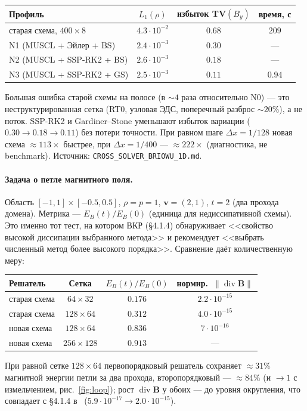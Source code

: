 \documentclass[12pt,a4paper]{article}
\newcommand{\divg}{\operatorname{div}}
\newcommand{\B}{\mathbf{B}}
\newcommand{\vv}{\mathbf{v}}
\newcommand{\code}[1]{\texttt{#1}}
\begin{document}
\begin{center}\footnotesize\setlength{\tabcolsep}{5pt}
\begin{tabular}{lccc}
\toprule
Профиль & $L_1(\rho)$ & избыток TV$(B_y)$ & время, с \\
\midrule
старая схема, $400\times8$ & $4.3\!\cdot\!10^{-2}$ & $0.68$ & $209$ \\
N1 (MUSCL + Эйлер + BS)  & $2.4\!\cdot\!10^{-3}$ & $0.30$ & --- \\
N2 (MUSCL + SSP-RK2 + BS)& $2.6\!\cdot\!10^{-3}$ & $0.18$ & --- \\
N3 (MUSCL + SSP-RK2 + GS)& $2.5\!\cdot\!10^{-3}$ & $0.11$ & $0.94$ \\
\bottomrule
\end{tabular}
\end{center}
\noindent\footnotesize Большая ошибка старой схемы на полосе (в
$\sim4$ раза относительно N0) --- это неструктурированная сетка (RT0, узловая
ЭДС, поперечный разброс $\sim20\%$), а не поток. SSP-RK2 и Gardiner--Stone
уменьшают избыток вариации ($0.30\to0.18\to0.11$) без потери точности. При
равном шаге $\Delta x=1/128$ новая схема $\approx113\times$ быстрее, при
$\Delta x=1/400$ --- $\approx222\times$ (диагностика, не benchmark). Источник:
\code{CROSS\_SOLVER\_BRIOWU\_1D.md}.\normalsize

\paragraph{Задача о петле магнитного поля.}
Область $[-1,1]\times[-0.5,0.5]$, $\rho=p=1$, $\vv=(2,1)$, $t=2$ (два прохода
домена). Метрика --- $E_B(t)/E_B(0)$ (единица для недиссипативной схемы). Это
именно тот тест, на котором ВКР \cite{shamanov2025} (\S4.1.4) обнаруживает
<<свойство высокой диссипации выбранного метода>> и рекомендует <<выбрать
численный метод более высокого порядка>>. Сравнение даёт количественную меру:

\begin{center}\footnotesize
\begin{tabular}{lccc}
\toprule
Решатель & Сетка & $E_B(t)/E_B(0)$ & нормир.\ $\|\divg\B\|$ \\
\midrule
старая схема          & $64\times32$   & $0.176$ & $2.2\!\cdot\!10^{-15}$ \\
старая схема            & $128\times64$  & $0.312$ & $4.0\!\cdot\!10^{-15}$ \\
новая схема             & $128\times64$  & $\mathbf{0.836}$ & $7\!\cdot\!10^{-16}$ \\
новая схема             & $256\times128$ & $0.913$ & --- \\
\bottomrule
\end{tabular}
\end{center}
\noindent\footnotesize При равной сетке $128\times64$ первопорядковый решатель
сохраняет $\approx31\%$ магнитной энергии петли за два прохода,
второпорядковый --- $\approx84\%$ (и $\to1$ с измельчением, рис.~\ref{fig:loop});
рост $\divg\B$ у обоих --- до уровня округления, что совпадает с
\S4.1.4 в~\cite{shamanov2025} ($5.9\!\cdot\!10^{-17}\to2.0\!\cdot\!10^{-15}$).
\normalsize
\end{document}
